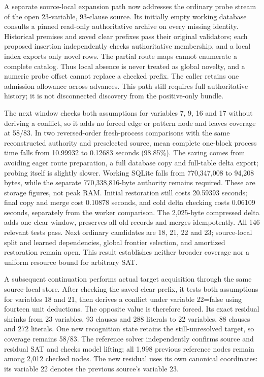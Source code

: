 \documentclass[11pt,a4paper]{article}
\numberwithin{equation}{section}
\theoremstyle{plain}
\theoremstyle{definition}
\theoremstyle{remark}
\begin{document}
A separate source-local expansion path now addresses the ordinary probe stream of the open 23-variable, 93-clause source. Its initially empty working database consults a pinned read-only authoritative archive on every missing identity. Historical premises and saved clear prefixes pass their original validators; each proposed insertion independently checks authoritative membership, and a local index exports only novel rows. The partial route maps cannot enumerate a complete catalog. Thus local absence is never treated as global novelty, and a numeric probe offset cannot replace a checked prefix. The caller retains one admission allowance across advances. This path still requires full authoritative history; it is not disconnected discovery from the positive-only bundle.

The next window checks both assumptions for variables 7, 9, 16 and 17 without deriving a conflict, so it adds no forced edge or pattern node and leaves coverage at 58/83. In two reversed-order fresh-process comparisons with the same reconstructed authority and preselected source, mean complete one-block process time falls from 10.99932 to 0.12683 seconds (98.85\%). The saving comes from avoiding eager route preparation, a full database copy and full-table delta export; probing itself is slightly slower. Working SQLite falls from 770,347,008 to 94,208 bytes, while the separate 770,338,816-byte authority remains required. These are storage figures, not peak RAM. Initial restoration still costs 20.59393 seconds; final copy and merge cost 0.10878 seconds, and cold delta checking costs 0.06109 seconds, separately from the worker comparison. The 2,025-byte compressed delta adds one clear window, preserves all old records and merges idempotently. All 146 relevant tests pass. Next ordinary candidates are 18, 21, 22 and 23; source-local split and learned dependencies, global frontier selection, and amortized restoration remain open. This result establishes neither broader coverage nor a uniform resource bound for arbitrary SAT.

A subsequent continuation performs actual target acquisition through the same source-local store. After checking the saved clear prefix, it tests both assumptions for variables 18 and 21, then derives a conflict under variable 22=false using fourteen unit deductions. The opposite value is therefore forced. Its exact residual shrinks from 23 variables, 93 clauses and 288 literals to 22 variables, 88 clauses and 272 literals. One new recognition state retains the still-unresolved target, so coverage remains 58/83. The reference solver independently confirms source and residual SAT and checks model lifting; all 1,998 previous reference nodes remain among 2,012 checked nodes. The new residual uses its own canonical coordinates: its variable 22 denotes the previous source's variable 23.
\end{document}

